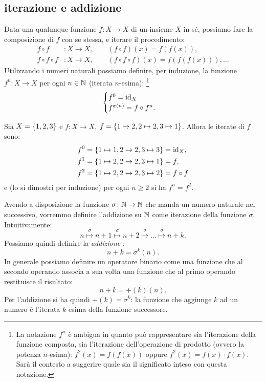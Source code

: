 \subsection{iterazione e addizione}
%
%
%
%
%
Data una qualunque funzione $f\colon X \to X$ di un insieme $X$ in sé, 
possiamo fare la composizione di $f$ con se stessa, e iterare il procedimento: 
\begin{align*}
  f\circ f &\colon X\to X, 
    \qquad (f\circ f)(x) = f(f(x)),\\ 
  f\circ f \circ f&\colon X\to X,
    \qquad(f\circ f \circ f) (x) = f(f(f(x))), \dots   
\end{align*}
Utilizzando i numeri naturali possiamo definire, per induzione, 
la funzione $f^n\colon X\to X$ per ogni $n\in {\mathbb N}$ 
(iterata $n$-esima):
\footnote{%
La notazione $f^n$ è ambigua in quanto può rappresentare 
sia l'iterazione della funzione composta, sia l'iterazione 
dell'operazione di prodotto (ovvero la potenza $n$-esima): 
$f^2(x) = f(f(x))$ oppure $f^2(x) = f(x) \cdot f(x)$. 
Sarà il contesto a suggerire quale sia il significato
inteso con questa notazione.
}
\begin{equation}
  \label{def:iterata}%
  \begin{cases}
    f^0 =  \id_X\\
    f^{\sigma(n)} = f\circ f^n.
  \end{cases}  
\end{equation}
%
\begin{example}
Sia $X={\left\{ 1,2,3 \right\}}$ e $f\colon X\to X$, $f = {\left\{ 1\mapsto 2, 2 \mapsto 2, 3\mapsto 1 \right\}}$.
Allora le iterate di $f$ sono:
\begin{align*}
  f^0 &= {\left\{ 1\mapsto 1, 2\mapsto 2, 3\mapsto 3 \right\}} = \mathrm{id}_X, \\
  f^1 &= {\left\{ 1\mapsto 2, 2 \mapsto 2, 3\mapsto 1 \right\}} = f,\\
  f^2 &= {\left\{ 1\mapsto 2, 2\mapsto 2, 3\mapsto 2 \right\}} = f\circ f
\end{align*}
e (lo si dimostri per induzione) per ogni $n\ge 2$ si ha $f^n = f^2$.
\end{example}

%
%
%

Avendo a disposizione la funzione $\sigma\colon {\mathbb N}\to{\mathbb N}$ 
che manda un numero naturale nel successivo, vorremmo definire 
l'addizione su ${\mathbb N}$ come iterazione della funzione $\sigma$.
Intuitivamente:
\[
  n \stackrel\sigma\mapsto n+1 \stackrel\sigma\mapsto n+2 
  \stackrel\sigma\mapsto \dots \stackrel\sigma\mapsto n+k. 
\]
Possiamo quindi definire la \emph{addizione}%
%
:
\[
  n+k = \sigma^k(n).  
\]
In generale possiamo definire un operatore binario come una funzione 
che al secondo operando associa a sua volta una funzione che al 
primo operando restituisce il risultato:
\[
  n + k = +(k)(n).
\]
Per l'addizione si ha quindi $+(k) = \sigma^k$:
la funzione che aggiunge $k$ ad un numero è l'iterata 
$k$-esima della funzione successore.

